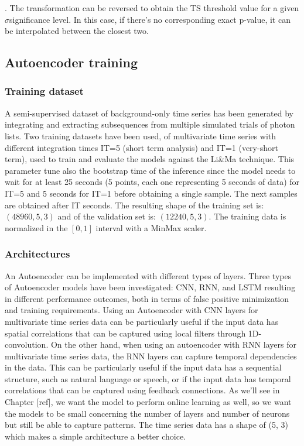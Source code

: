 . The transformation can be reversed to obtain the TS threshold value for a given $\sigma $significance level. In this case, if there's no corresponding exact p-value, it can be interpolated between the closest two. 

\subsection{Autoencoder training}
\subsubsection{Training dataset}
A semi-supervised dataset of background-only time series has been generated by integrating and extracting subsequences from multiple simulated trials of photon lists. Two training datasets have been used, of multivariate time series with different integration times IT=5 (short term analysis) and IT=1 (very-short term), used to train and evaluate the models against the Li\&Ma technique. This parameter tune also the bootstrap time of the inference since the model needs to wait for at least 25 seconds (5 points, each one representing 5 seconds of data) for IT=5 and 5 seconds for IT=1 before obtaining a single sample. The next samples are obtained after IT seconds. The resulting shape of the training set is: $(48960, 5, 3)$ and of the validation set is: $(12240, 5, 3)$. The training data is normalized in the $[0, 1]$ interval with a MinMax scaler.

\subsubsection{Architectures}
An Autoencoder can be implemented with different types of layers. Three types of Autoencoder models have been investigated: CNN, RNN, and LSTM resulting in different performance outcomes, both in terms of false positive minimization and training requirements. Using an Autoencoder with CNN layers for multivariate time series data can be particularly useful if the input data has spatial correlations that can be captured using local filters through 1D-convolution. On the other hand, when using an autoencoder with RNN layers for multivariate time series data, the RNN layers can capture temporal dependencies in the data. This can be particularly useful if the input data has a sequential structure, such as natural language or speech, or if the input data has temporal correlations that can be captured using feedback connections. 
As we'll see in Chapter [ref], we want the model to perform online learning as well, so we want the models to be small concerning the number of layers and number of neurons but still be able to capture patterns. The time series data has a shape of (5, 3) which makes a simple architecture a better choice. 

